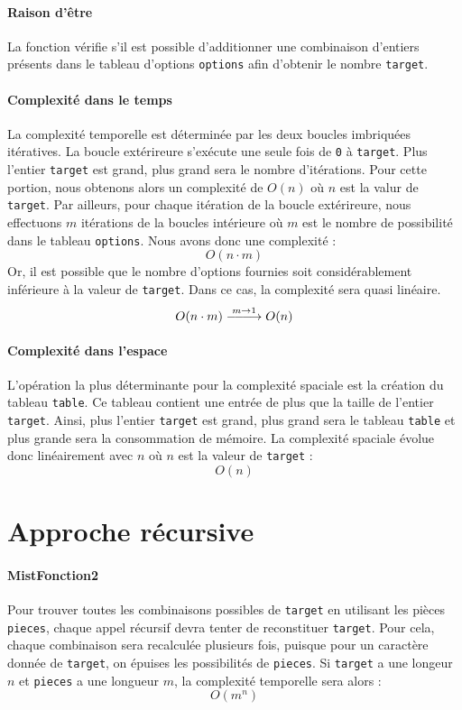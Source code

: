 \documentclass[9pt]{report}
\DeclareRobustCommand{\looongrightarrow}{%
  \DOTSB\relbar\joinrel\relbar\joinrel\relbar\joinrel\rightarrow
}
\DeclareRobustCommand{\looongrightarrow}{%
  \DOTSB\relbar\joinrel\relbar\joinrel\relbar\joinrel\rightarrow
}
\begin{document}
\begin{multicols*}{2}
  \paragraph{Raison d'être}
  La fonction vérifie s'il est possible d'additionner une combinaison 
  d'entiers présents 
  dans le tableau d'options \texttt{options} afin d'obtenir le nombre 
  \texttt{target}.


  \paragraph{Complexité dans le temps}
  La complexité temporelle est déterminée par les deux boucles imbriquées 
  itératives. La boucle extérireure s'exécute une seule fois de 
  \texttt{0} à \texttt{target}. Plus l'entier \texttt{target} est grand, 
  plus grand sera le nombre d'itérations. Pour cette portion, nous obtenons alors 
  un complexité de $O(n)$ où $n$ est la valur de \texttt{target}. Par ailleurs, 
  pour chaque itération de la boucle extérireure, nous effectuons $m$ itérations 
  de la boucles intérieure où $m$ est le nombre de possibilité dans le 
  tableau \texttt{options}. Nous avons donc une complexité :
           \[ O( n \cdot m)\]
  Or, il est possible que le nombre d'options fournies soit considérablement 
  inférieure à la valeur de \texttt{target}. Dans ce cas, la complexité         
  sera quasi linéaire.  
          \[O(n \cdot m) \stackrel{m \to 1}{\looongrightarrow} O(n) \]


  \paragraph{Complexité dans l'espace}
  L'opération la plus déterminante pour la complexité spaciale est la création 
  du tableau \texttt{table}. Ce tableau contient une entrée de plus que la taille de l'entier 
  \texttt{target}. Ainsi, plus l'entier \texttt{target} est grand, plus grand 
  sera le tableau \texttt{table} et plus grande sera la consommation de mémoire. 
  La complexité spaciale évolue donc linéairement avec $n$ où $n$ est la 
  valeur de \texttt{target} :
  \[ O(n) \]


  \section{Approche récursive}
  \paragraph{MistFonction2}
  Pour trouver toutes les combinaisons possibles de \texttt{target} en utilisant les 
  pièces \texttt{pieces}, chaque appel récursif devra tenter de reconstituer 
  \texttt{target}. Pour cela, chaque combinaison sera recalculée plusieurs fois, 
  puisque pour un caractère donnée de \texttt{target}, on épuises les 
  possibilités de \texttt{pieces}. Si \texttt{target} a une longeur $n$ 
  et \texttt{pieces} a une longueur $m$, la complexité temporelle sera alors :
  \[ O(m^n) \]





\end{multicols*}
\end{document}
